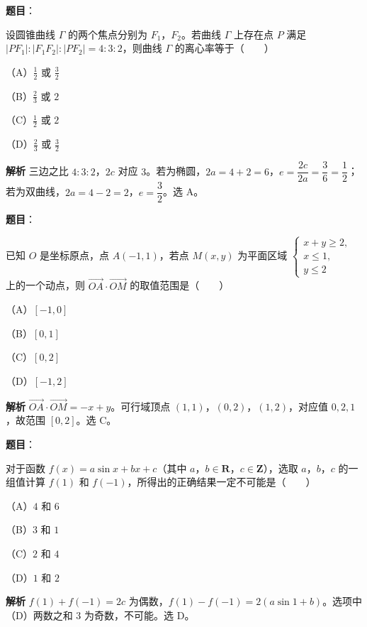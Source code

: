 \begin{answer}

\textbf{题目}：

设圆锥曲线 $\Gamma$ 的两个焦点分别为 $F_1$，$F_2$。若曲线 $\Gamma$ 上存在点 $P$ 满足 $|PF_1|:|F_1F_2|:|PF_2|=4:3:2$，则曲线 $\Gamma$ 的离心率等于\mbox{（　　）}

（A）$\frac12$ 或 $\frac32$

（B）$\frac23$ 或 $2$

（C）$\frac12$ 或 $2$

（D）$\frac23$ 或 $\frac32$

\textbf{解析}
三边之比 $4:3:2$，$2c$ 对应 $3$。若为椭圆，$2a=4+2=6$，$e=\dfrac{2c}{2a}=\dfrac36=\dfrac12$；若为双曲线，$2a=4-2=2$，$e=\dfrac32$。选 A。


\end{answer}
\begin{answer}

\textbf{题目}：

已知 $O$ 是坐标原点，点 $A(-1,1)$，若点 $M(x,y)$ 为平面区域 $\begin{cases}x+y\geqslant2,\\x\leqslant1,\\y\leqslant2\end{cases}$ 上的一个动点，则 $\overrightarrow{OA}\cdot\overrightarrow{OM}$ 的取值范围是\mbox{（　　）}

（A）$[-1,0]$

（B）$[0,1]$

（C）$[0,2]$

（D）$[-1,2]$

\textbf{解析}
$\overrightarrow{OA}\cdot\overrightarrow{OM}=-x+y$。可行域顶点 $(1,1)$，$(0,2)$，$(1,2)$，对应值 $0,2,1$，故范围 $[0,2]$。选 C。


\end{answer}
\begin{answer}

\textbf{题目}：

对于函数 $f(x)=a\sin x+bx+c$（其中 $a$，$b\in\mathbf R$，$c\in\mathbf Z$），选取 $a$，$b$，$c$ 的一组值计算 $f(1)$ 和 $f(-1)$，所得出的正确结果一定不可能是\mbox{（　　）}

（A）$4$ 和 $6$

（B）$3$ 和 $1$

（C）$2$ 和 $4$

（D）$1$ 和 $2$

\textbf{解析}
$f(1)+f(-1)=2c$ 为偶数，$f(1)-f(-1)=2(a\sin1+b)$。选项中（D）两数之和 $3$ 为奇数，不可能。选 D。


\end{answer}
